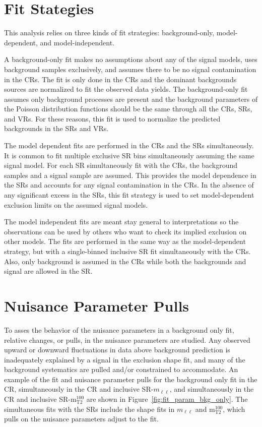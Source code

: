 \section{Fit Stategies}
\label{sec:statanal:fit}
This analysis relies on three kinds of fit strategies: background-only, model-dependent, and model-independent.

A background-only fit makes no assumptions about any of the signal models, uses background samples exclusively, and assumes there to be no signal contamination in the CRs.  The fit is only done in the CRs and the dominant backgrounds sources are normalized to fit the observed data yields.  The background-only fit assumes only background processes are present and the background parameters of the Poisson distribution functions should be the same through all the CRs, SRs, and VRs.  For these reasons, this fit is used to normalize the predicted backgrounds in the SRs and VRs.

The model dependent fits are performed in the CRs and the SRs simultaneously.  It is common to fit multiple exclusive SR bins simultaneously assuming the same signal model.  For each SR simultaneously fit with the CRs, the background samples and a signal sample are assumed.  This provides the model dependence in the SRs and accounts for any signal contamination in the CRs.  In the absence of any significant excess in the SRs, this fit strategy is used to set model-dependent exclusion limits on the assumed signal models.

The model independent fits are meant stay general to interpretations so the observations can be used by others who want to check its implied exclusion on other models.  The fits are performed in the same way as the model-dependent strategy, but with a single-binned inclusive SR fit simultaneously with the CRs.  Also, only background is assumed in the CRs while both the backgrounds and signal are allowed in the SR. 


\section{Nuisance Parameter Pulls}
\label{sec:statanal:pull}
To asses the behavior of the nuisance parameters in a background only fit, relative changes, or pulls, in the nuisance parameters are studied.  Any observed upward or downward fluctuations in data above background prediction is inadequately explained by a signal in the exclusion shape fit, and many of the background systematics are pulled and/or constrained to accommodate. An example of the fit and nuisance parameter pulls for the background only fit in the CR, simultaneously in the CR and inclusive SR-$m_{\ell\ell}$, and simultaneously in the CR and inclusive SR-$\mathrm{m_{T2}^{100}}$ are shown in Figure~\ref{fig:fit_param_bkg_only}.  The simultaneous fits with the SRs include the shape fits in $m_{\ell\ell}$ and $\mathrm{m_{T2}^{100}}$, which pulls on the nuisance parameters adjust to the fit.  

